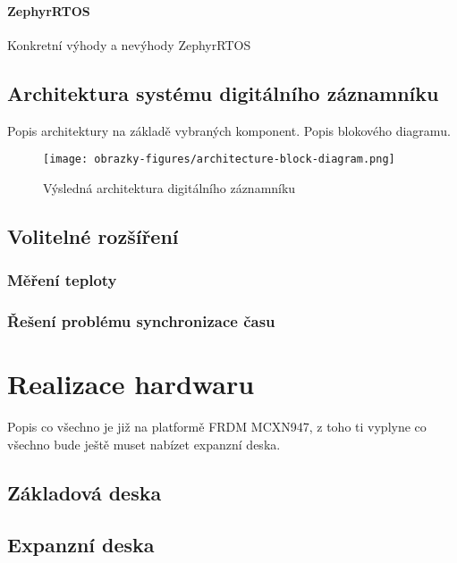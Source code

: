 \subsubsection{ZephyrRTOS}
Konkretní výhody a nevýhody ZephyrRTOS


\section{Architektura systému digitálního záznamníku}
Popis architektury na základě vybraných komponent. Popis blokového diagramu.

\begin{figure}[h]
    \centering
    \texttt{[image: obrazky-figures/architecture-block-diagram.png]}
    
    \caption{Výsledná architektura digitálního záznamníku}
    \label{fig:low-power-modes}
\end{figure}


\section{Volitelné rozšíření}
\subsection{Měření teploty}


\subsection{Řešení problému synchronizace času}


\chapter{Realizace hardwaru}
Popis co všechno je již na platformě FRDM MCXN947, z toho ti vyplyne co všechno bude ještě muset nabízet expanzní deska.
\section{Základová deska}
\section{Expanzní deska}

